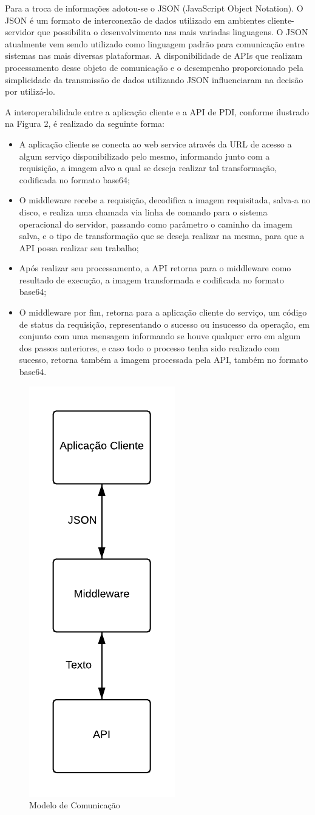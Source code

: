 \documentclass[12pt]{article}
\begin{document}
Para a troca de informações adotou-se o JSON (JavaScript Object Notation). O
JSON é um formato de interconexão de dados utilizado em ambientes cliente-servidor
que possibilita o desenvolvimento nas mais variadas linguagens. O JSON atualmente
vem sendo utilizado como linguagem padrão para comunicação entre sistemas nas mais
diversas plataformas. A disponibilidade de APIs que realizam processamento desse objeto de comunicação e o desempenho proporcionado
pela simplicidade da transmissão de dados utilizando JSON influenciaram na decisão
por utilizá-lo.

A interoperabilidade entre a aplicação cliente e a API de PDI, conforme ilustrado na Figura 2, é
realizado da seguinte forma:
\begin{itemize}
	\item A aplicação cliente se conecta ao web service através da URL de acesso a algum serviço disponibilizado pelo mesmo, informando junto com a requisição, a imagem alvo a qual se deseja realizar tal transformação, codificada no formato base64;
	\item O middleware recebe a requisição, decodifica a imagem requisitada, salva-a no disco, e realiza uma chamada via linha de comando para o sistema operacional do servidor, passando como parâmetro o caminho da imagem salva, e o tipo de transformação que se deseja realizar na mesma, para que a API possa realizar seu trabalho;
	\item Após realizar seu processamento, a API retorna para o middleware como resultado de execução, a imagem transformada e codificada no formato base64;
	\item O middleware por fim, retorna para a aplicação cliente do serviço, um código de status da requisição, representando o sucesso ou insucesso da operação, em conjunto com uma mensagem informando se houve qualquer erro em algum dos passos anteriores, e caso todo o processo tenha sido realizado com sucesso, retorna também a imagem processada pela API, também no formato base64.
\end{itemize}

\begin{figure}[ht]
	\centering
	\includegraphics[width=.2\textwidth]{modelo-comunicacao.png}
	\caption{Modelo de Comunicação}
	\label{fig:Figura2}
\end{figure}
\end{document}
